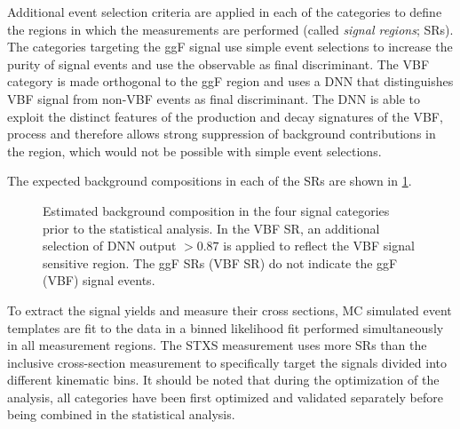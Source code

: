 Additional event selection criteria are applied in each of the categories to define the regions in which the measurements are performed (called \emph{signal regions}; SRs).
The categories targeting the ggF signal use simple event selections to increase the purity of signal events and use the \mT observable as final discriminant. 
The VBF \TwoJet category is made orthogonal to the ggF \TwoJet region and uses a DNN that distinguishes VBF signal from non-VBF events as final discriminant.
The DNN is able to exploit the distinct features of the production and decay signatures of the VBF, \HWW process and therefore allows strong suppression of background contributions in the \TwoJet region, which would not be possible with simple event selections. 

The expected background compositions in each of the SRs are shown in \cref{fig:bkg-composition}.
\begin{figure}[ht]
     \hfill
    \caption[Estimated background composition in the four signal categories.]{Estimated background composition in the four signal categories prior to the statistical analysis. In the VBF \TwoJet SR, an additional selection of DNN output $>0.87$ is applied to reflect the VBF signal sensitive region. The ggF SRs (VBF SR) do not indicate the ggF (VBF) signal events.}
    \label{fig:bkg-composition}
\end{figure}
To extract the signal yields and measure their cross sections, MC simulated event templates are fit to the data in a binned 
likelihood fit performed simultaneously in all measurement regions.
The STXS measurement uses more SRs than the inclusive cross-section measurement to specifically target the signals divided into different kinematic bins. 
It should be noted that during the optimization of the analysis, all categories have been first optimized and validated separately before being combined in the statistical analysis.


